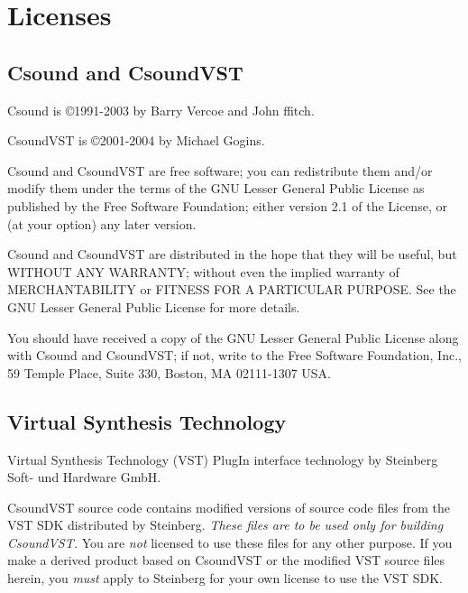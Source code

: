 \documentclass[10pt,letterpaper,onecolumn]{ltxguide}
\begin{document}
\section{Licenses}

\subsection{Csound and CsoundVST}

Csound is \copyright 1991-2003 by Barry Vercoe and John ffitch.

CsoundVST is \copyright 2001-2004 by Michael Gogins.

Csound and CsoundVST are free software; you can redistribute them and/or modify them under the terms of the GNU Lesser General Public License as published by the Free Software Foundation; either version 2.1 of the License, or (at your option) any later version.

Csound and CsoundVST are distributed in the hope that they will be useful, but WITHOUT ANY WARRANTY; without even the implied warranty of MERCHANTABILITY or FITNESS FOR A PARTICULAR PURPOSE.  See the GNU Lesser General Public License for more details.

You should have received a copy of the GNU Lesser General Public License along with Csound and CsoundVST; if not, write to the Free Software Foundation, Inc., 59 Temple Place, Suite 330, Boston, MA 02111-1307 USA.
\subsection{Virtual Synthesis Technology}
Virtual Synthesis Technology (VST) PlugIn interface technology by Steinberg Soft- und Hardware GmbH. 

CsoundVST source code contains modified versions of source code files from the VST SDK distributed by Steinberg. \emph{These files are to be used only for building CsoundVST.} You are \emph{not} licensed to use these files for any other purpose. If you make a derived product based on CsoundVST or the modified VST source files herein, you \emph{must} apply to Steinberg for your own license to use the VST SDK.
\end{document}
